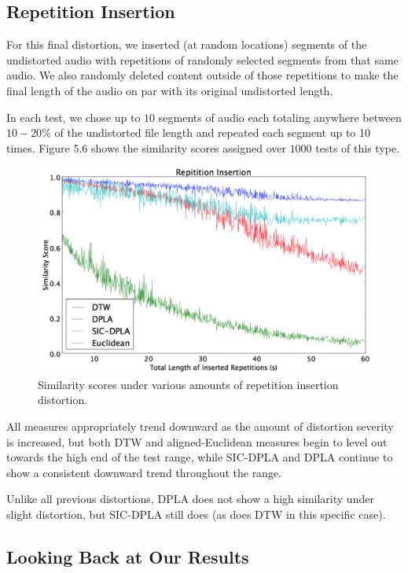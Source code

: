 \documentclass[a4paper,12pt]{report} 	%
\numberwithin{figure}{chapter}
\numberwithin{table}{chapter}
\numberwithin{equation}{chapter}
\begin{document}
\begin{flushleft}
\subsection{Repetition Insertion}
For this final distortion, we inserted (at random locations) segments of the undistorted audio with repetitions of randomly selected segments from that same audio. We also randomly deleted content outside of those repetitions to make the final length of the audio on par with its original undistorted length.

In each test, we chose up to $10$ segments of audio each totaling anywhere between $10-20\%$ of the undistorted file length and repeated each segment up to 10 times. Figure 5.6 shows the similarity scores assigned over $1000$ tests of this type.
\begin{figure}[h!]
\begin{center}
\includegraphics[scale=0.5,width=\linewidth]{RepetitionInsertion}
\caption[Repetition Insertion Results]{Similarity scores under various amounts of repetition insertion distortion.}
\end{center}
\end{figure}

All measures appropriately trend downward as the amount of distortion severity is increased, but both DTW and aligned-Euclidean measures begin to level out towards the high end of the test range, while SIC-DPLA and DPLA continue to show a consistent downward trend throughout the range. 

Unlike all previous distortions, DPLA does not show a high similarity under slight distortion, but SIC-DPLA still does (as does DTW in this specific case).

\subsection{Looking Back at Our Results}


\end{flushleft}
\end{document}
